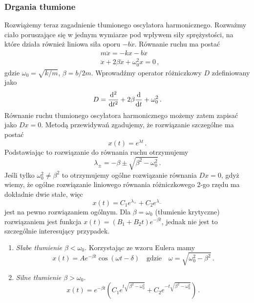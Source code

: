 \documentclass[../main.tex]{subfiles}
\begin{document}
    \subsubsection{Drgania tłumione}
    Rozwiążemy teraz zagadnienie tłumionego oscylatora harmonicznego. Rozważmy ciało poruszające się
    w jednym wymiarze pod wpływem siły sprężystości, na które działa również liniowa siła oporu
    \(-b\dot x\). Równanie ruchu ma postać
    \begin{equation*}
        \begin{split}
            &m\ddot x=-kx-b\dot x\\
            &\ddot x+2\beta\dot x+\omega_0^2x=0\,,
        \end{split}
    \end{equation*}
    gdzie \(\omega_0=\sqrt{k/m}\), \(\beta=b/2m\). Wprowadźmy operator różniczkowy \(D\)
    zdefiniowany jako
    \begin{equation*}
        D=\dv[2]{}{t}+2\beta\dv{}{t}+\omega_0^2\,.
    \end{equation*}
    Równanie ruchu tłumionego oscylatora harmonicznego możemy zatem zapisać jako \(Dx=0\). Metodą
    przewidywań zgadujemy, że rozwiązanie szczególne ma postać
    \begin{equation*}
        x(t)=e^{\lambda t}\,.
    \end{equation*}
    Podstawiając to rozwiązanie do równania ruchu otrzymujemy
    \begin{equation*}
        \lambda_\pm=-\beta\pm\sqrt{\beta^2-\omega_0^2}\,.
    \end{equation*}
    Jeśli tylko \(\omega_0^2\neq\beta^2\) to otrzymujemy ogólne rozwiązanie równania \(Dx=0\), gdyż
    wiemy, że ogólne rozwiązanie liniowego równania różniczkowego 2-go rzędu ma dokładnie dwie
    stałe, więc
    \begin{equation*}
        x(t)=C_1e^{\lambda_{+}}+C_2e^{\lambda_{-}}
    \end{equation*}
    jest na pewno rozwiązaniem ogólnym. Dla \(\beta=\omega_0\) (tłumienie krytyczne) rozwiązaniem
    jest funkcja \(x(t)=(B_1+B_2t)e^{-\beta t}\), jednak nie jest to szczególnie interesujący
    przypadek.
    \begin{enumerate}
        \item \textit{Słabe tłumienie \(\beta<\omega_0\).} Korzystając ze wzoru Eulera mamy
        \begin{equation*}
            x(t)=Ae^{-\beta t}\cos(\omega t-\delta)\quad\text{gdzie}\quad \omega=\sqrt{\omega_0^2-\beta^2}\,.
        \end{equation*}
        
        \item \textit{Silne tłumienie \(\beta>\omega_0\).} 
        \begin{equation*}
            x(t)=e^{-\beta t}\left(C_1e^{t\sqrt{\beta^2-\omega_0^2}}+C_2e^{-t\sqrt{\beta^2-\omega_0^2}}\right)\,.
        \end{equation*}
    \end{enumerate}
\end{document}
